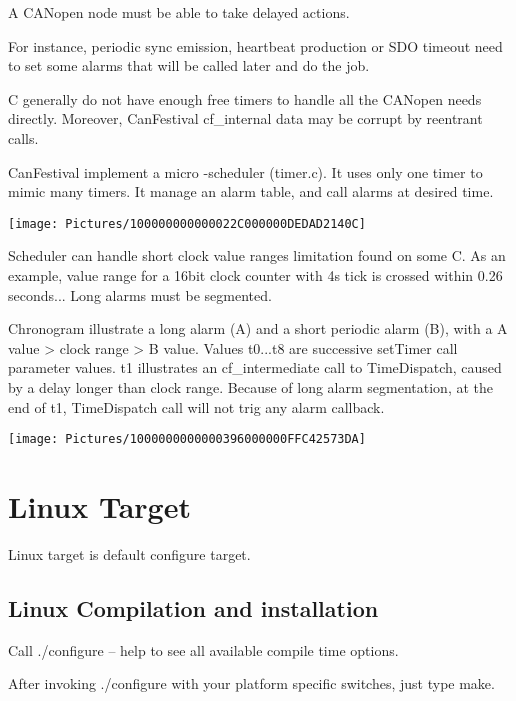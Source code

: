 \documentclass[12pt,english,a4paper]{book}
\newcommand{\canopen}{CANopen }
\begin{document}
A \canopen node must be able to take delayed actions.

For instance, periodic sync emission, heartbeat production or SDO timeout
need to set some alarms that will be called later and do the job.

{\textmu}C generally do not have enough free timers to handle all
the \canopen needs directly. Moreover, CanFestival cf_internal data
may be corrupt by reentrant calls.

CanFestival implement a micro -scheduler (timer.c). It uses only one
timer to mimic many timers. It manage an alarm table, and call alarms
at desired time.

\begin{center}
\texttt{[image: Pictures/100000000000022C000000DEDAD2140C]} 
\par\end{center}

Scheduler can handle short clock value ranges limitation found on
some {\textmu}C. As an example, value range for a 16bit clock counter
with 4{\textmu}s tick is crossed within 0.26 seconds... Long alarms
must be segmented.

Chronogram illustrate a long alarm (A) and a short periodic alarm
(B), with a A value {\textgreater} clock range {\textgreater}
B value. Values t0...t8 are successive setTimer call parameter values.
t1 illustrates an cf_intermediate call to TimeDispatch, caused by a delay
longer than clock range. Because of long alarm segmentation, at the
end of t1, TimeDispatch call will not trig any alarm callback.

\begin{center}
\texttt{[image: Pictures/1000000000000396000000FFC42573DA]} 
\par\end{center}


\section{Linux Target}

Linux target is default configure target.


\subsection{Linux Compilation and installation}

Call ./configure -- help to see all available compile time options.

After invoking ./configure with your platform specific switches, just
type make.
\end{document}
